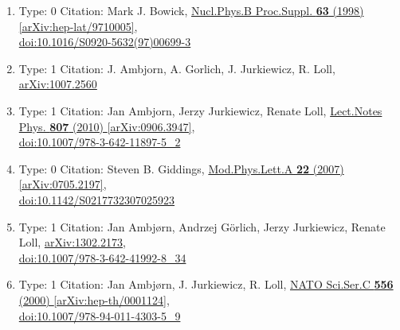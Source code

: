 \documentclass[a4paper,10pt]{article}
\begin{document}
\begin{enumerate}
\begin{enumerate}
  \item Type: 0 Citation: Mark J. Bowick, \href{https://www.doi.org/10.1016/S0920-5632(97)00699-3}{Nucl.Phys.B Proc.Suppl. {\bf 63} (1998) }  \href{https://arxiv.org/abs/hep-lat/9710005}{[arXiv:hep-lat/9710005]},\\\href{https://www.doi.org/10.1016/S0920-5632(97)00699-3}{doi:10.1016/S0920-5632(97)00699-3}
  \item Type: 1 Citation: J. Ambjorn, A. Gorlich, J. Jurkiewicz, R. Loll, \href{https://arxiv.org/abs/1007.2560}{arXiv:1007.2560}
  \item Type: 1 Citation: Jan Ambjorn, Jerzy Jurkiewicz, Renate Loll, \href{https://www.doi.org/10.1007/978-3-642-11897-5_2}{Lect.Notes Phys. {\bf 807} (2010) }  \href{https://arxiv.org/abs/0906.3947}{[arXiv:0906.3947]},\\\href{https://www.doi.org/10.1007/978-3-642-11897-5_2}{doi:10.1007/978-3-642-11897-5\_2}
  \item Type: 0 Citation: Steven B. Giddings, \href{https://www.doi.org/10.1142/S0217732307025923}{Mod.Phys.Lett.A {\bf 22} (2007) }  \href{https://arxiv.org/abs/0705.2197}{[arXiv:0705.2197]},\\\href{https://www.doi.org/10.1142/S0217732307025923}{doi:10.1142/S0217732307025923}
  \item Type: 1 Citation: Jan Ambjørn, Andrzej Görlich, Jerzy Jurkiewicz, Renate Loll, \href{https://arxiv.org/abs/1302.2173}{arXiv:1302.2173},\\\href{https://www.doi.org/10.1007/978-3-642-41992-8_34}{doi:10.1007/978-3-642-41992-8\_34}
  \item Type: 1 Citation: Jan Ambjørn, J. Jurkiewicz, R. Loll, \href{https://www.doi.org/10.1007/978-94-011-4303-5_9}{NATO Sci.Ser.C {\bf 556} (2000) }  \href{https://arxiv.org/abs/hep-th/0001124}{[arXiv:hep-th/0001124]},\\\href{https://www.doi.org/10.1007/978-94-011-4303-5_9}{doi:10.1007/978-94-011-4303-5\_9}

\end{enumerate}
\end{enumerate}
\end{document}
